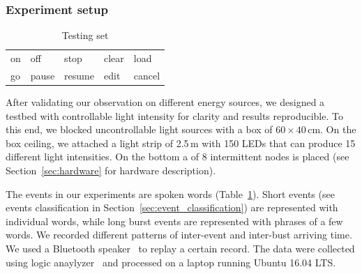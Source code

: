 \subsubsection{Experiment setup}
\label{sec:experiment_setup}
%
\begin{table}[H]
\centering
\caption{Testing set}
\label{tab:words}
\begin{tabular}{lllll}
\hline
on    & off  & stop & clear & load   \\
go & pause & resume & edit  & cancel  \\  
\hline  
\end{tabular}
\end{table}
%
After validating our observation on different energy sources, we designed a testbed with controllable light intensity for clarity and results reproducible. To this end, we blocked uncontrollable light sources with a box of $60 \times 40$\,cm. On the box ceiling, we attached a light strip of 2.5\,m with 150 LEDs that can produce 15 different light intensities. On the bottom a \fullCIM of 8 intermittent nodes is placed (see Section~\ref{sec:hardware} for hardware description).

The events in our experiments are spoken words (Table~\ref{tab:words}). 
Short events (see events classification in Section~\ref{sec:event_classification}) are represented with individual words, while long burst events are represented with phrases of a few words.
We recorded different patterns of inter-event and inter-bust arriving time. We used a Bluetooth speaker~\cite{jbl} to replay a certain record. The data were collected using logic anaylyzer~\cite{saleae} and processed on a laptop running Ubuntu 16.04 LTS. 
%
